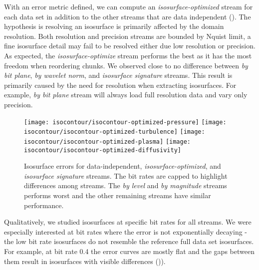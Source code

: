 With an error metric defined, we can compute an \emph{isosurface-optimized} stream for each data set in addition
to the other streams that are data independent (). The hypothesis is resolving an
isosurface is primarily affected by the domain resolution.
Both resolution and precision streams are bounded by Nquist limit, a fine isosurface detail may fail
to be resolved either due low resolution or precision. As expected, the {\em isosurface-optimize} stream performs
the best as it has the most freedom when reordering chunks. We observed close to no difference between {\em by bit
plane}, {\em by wavelet norm}, and {\em isosurface signature} streams. This result is primarily caused by the need for
resolution when extracting isosurfaces. For example, {\em by bit plane} stream will always load full resolution data and
vary only precision.

\begin{figure}
	\centering
	{\texttt{[image: isocontour/isocontour-optimized-pressure]}}
	{\texttt{[image: isocontour/isocontour-optimized-turbulence]}}
	{\texttt{[image: isocontour/isocontour-optimized-plasma]}}
	{\texttt{[image: isocontour/isocontour-optimized-diffusivity]}}
	\caption{Isosurface errors for data-independent, \emph{isosurface-optimized}, and
                 {\em isosurface signature} streams. The bit rates are capped to highlight differences
                 among streams. The {\em by level} and {\em by magnitude} streams performs worst and the other remaining
                 streams have similar performance.}
	\label{fig:isocontour-plots}
\end{figure}

Qualitatively, we studied isosurfaces at specific bit rates for all streams. We were especially interested
at bit rates where the error is not exponentially decaying - the low bit rate isosurfaces do not resemble
the reference full data set isosurfaces. For example, at bit rate 0.4 the error curves are mostly flat and the gaps between
them result in isosurfaces with visible differences ()).

